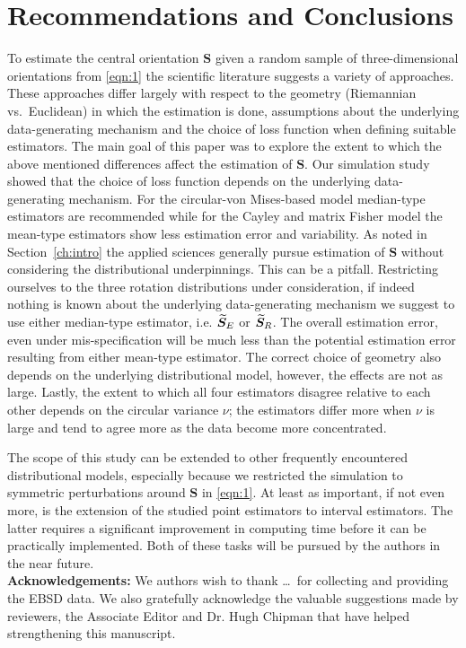\section{Recommendations and Conclusions}\label{sec:disc}

To estimate the central orientation $\bm S$ given a random sample of three-dimensional orientations from \eqref{eqn:1} the scientific literature suggests a variety of approaches. These approaches differ largely with respect to the geometry (Riemannian vs.~Euclidean) in which the estimation is done, assumptions about the underlying data-generating mechanism and the choice of loss function when defining suitable estimators. The main goal of this paper was to explore the extent to which the above mentioned differences affect the estimation of $\bm S$. 
Our simulation study showed that the choice of loss function depends on the underlying data-generating mechanism.  For the circular-von Mises-based model median-type estimators are recommended while for the Cayley and matrix Fisher model the mean-type estimators show less estimation error and variability. As noted in Section~\ref{ch:intro} the applied sciences generally pursue estimation of $\bm S$ without considering the distributional underpinnings. This can be a pitfall. Restricting ourselves to the three rotation distributions under consideration,  if indeed nothing is known about the underlying data-generating mechanism we suggest to use either median-type estimator, i.e. ${\widetilde{\bm S}_E}$ or ${\widetilde{\bm S}_R}$. The overall estimation error, even under mis-specification will be much less than the potential estimation error resulting from either mean-type estimator. The correct choice of geometry also depends on the underlying distributional model, however, the effects are not as large. %
Lastly, the extent to which all four estimators disagree relative to each other depends on the circular variance $\nu$; the estimators differ more when $\nu$ is large and tend to agree more as the data become more concentrated.  
   
The scope of this study can be extended to other frequently encountered distributional models, especially because we restricted the simulation to symmetric perturbations around $\bm S$ in \eqref{eqn:1}. At least as important, if not even more, is the extension of the studied point estimators to interval estimators. The latter requires a significant improvement in computing time before it can be practically implemented. Both of these tasks will be pursued by the authors in the near future.\\

\noindent \textbf{Acknowledgements:} We authors wish to thank \ldots \, for collecting and providing the EBSD data. We also gratefully acknowledge the valuable suggestions made by reviewers, the Associate Editor and Dr. Hugh Chipman that have helped strengthening this manuscript.

